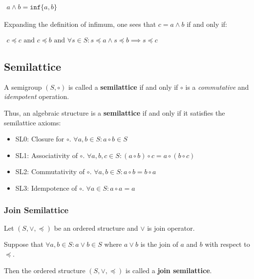 \begin{math}
  \begin{array}{c}
    a \wedge b =\mathtt{inf} \{ a, b \}
  \end{array}
\end{math}


Expanding the definition of infimum, one sees that $c = a \wedge b$ if
and only if:

\begin{math}
  \begin{array}{c}
    c \preceq c\text{ and }c \preceq b\text{ and } \forall s \in S: s \preceq a \land s \preceq b \implies s \preceq c
  \end{array}
\end{math}


\subsection{Semilattice}
\label{sec:semilattice}

A semigroup $(S, \circ)$ is called a \textbf{semilattice} if and only
if $\circ$ is a \textit{commutative} and \textit{idempotent}
operation.

Thus, an algebraic structure is a \textbf{semilattice} if and only if
it satisfies the semilattice axioms:

\begin{itemize}
\item SL0: Closure for $\circ$. $\forall a, b \in S: a \circ b \in S$
\item SL1: Associativity of $\circ$.
  $\forall a, b, c \in S: (a \circ b) \circ c = a \circ (b \circ c)$
\item SL2: Commutativity of $\circ$.
  $\forall a, b \in S: a \circ b = b \circ a$
\item SL3: Idempotence of $\circ$. $\forall a \in S: a \circ a = a$
\end{itemize}


\subsubsection{Join Semilattice}
Let $(S, \vee, \preceq)$ be an ordered structure and $\vee$ is join
operator.

Suppose that $\forall a, b \in S: a \vee b \in S$ where $a \vee b$ is
the join of $a$ and $b$ with respect to $\preceq$.

Then the ordered structure $(S, \vee, \preceq)$ is called a
\textbf{join semilattice}.


